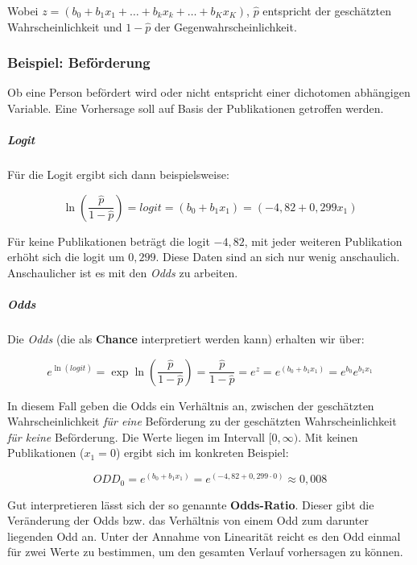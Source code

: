 \documentclass{article}
\numberwithin{equation}{section}
\begin{document}
Wobei $z = (b_0 + b_1 x_1 + \dots + b_k x_k + \dots + b_K x_K)$, $\hat p$ entspricht der geschätzten Wahrscheinlichkeit und $1-\hat p$ der Gegenwahrscheinlichkeit.

\subsubsection{Beispiel: Beförderung}

Ob eine Person befördert wird oder nicht entspricht einer dichotomen abhängigen Variable. Eine Vorhersage soll auf Basis der Publikationen getroffen werden.

\subparagraph{Logit}

Für die Logit ergibt sich dann beispielsweise:

\begin{equation}
\ln \left( \frac{\hat p}{1 - \hat p} \right) = logit = (b_0 + b_1 x_1) = (-4,82 + 0,299 x_1)
\end{equation}

Für keine Publikationen beträgt die logit $-4,82$, mit jeder weiteren Publikation erhöht sich die logit um $0,299$. Diese Daten sind an sich nur wenig anschaulich. Anschaulicher ist es mit den \emph{Odds} zu arbeiten.

\subparagraph{Odds}

Die \emph{Odds} (die als \textbf{Chance} interpretiert werden kann) erhalten wir über:

\begin{equation}
e^{\ln (logit)} = \exp{\ln \left( \frac{\hat p}{1 - \hat p} \right)} = \frac{\hat p}{1 - \hat p} = e^z = e^{(b_0 + b_1 x_1)} = e^{b_0} e^{b_1 x_1}
\end{equation}

In diesem Fall geben die Odds ein Verhältnis an, zwischen der geschätzten Wahrscheinlichkeit \emph{für eine} Beförderung zu der geschätzten Wahrscheinlichkeit \emph{für keine} Beförderung. Die Werte liegen im Intervall $[0,\infty)$. Mit keinen Publikationen ($x_1 = 0$) ergibt sich im konkreten Beispiel:

\begin{equation}
ODD_0 = e^{(b_0 + b_1 x_1)} = e^{(-4,82 + 0,299 \cdot 0)} \approx 0,008
\label{eq:odd-1}
\end{equation}

Gut interpretieren lässt sich der so genannte \textbf{Odds-Ratio}. Dieser gibt die Veränderung der Odds bzw. das Verhältnis von einem Odd zum darunter liegenden Odd an. Unter der Annahme von Linearität reicht es den Odd einmal für zwei Werte zu bestimmen, um den gesamten Verlauf vorhersagen zu können.
\end{document}
